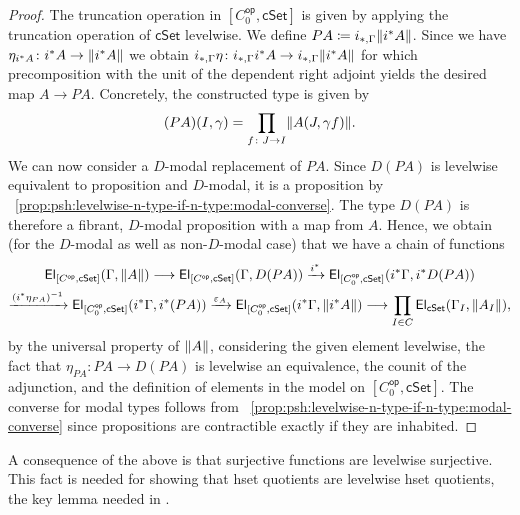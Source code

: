 \documentclass[10pt,a4paper]{article}
\theoremstyle{definition}
\theoremstyle{remark}
\newcommand{\cSet}{\mathsf{cSet}}
\DeclareMathOperator\op{\mathsf{op}}
\newcommand\El{\mathsf{El}}
\begin{document}
\begin{proof}
  The truncation operation in \([C_0^{\op}, \cSet]\) is given by applying the truncation operation of \(\cSet\) levelwise.
  We define \(PA \coloneqq i_{*,\Gamma}\trunc{i^*A}\).
  Since we have \(\eta_{i^*A} \colon i^* A \to \trunc{i^*A}\) we obtain \(i_{*,\Gamma}\eta \colon i_{*,\Gamma}i^*A \to i_{*,\Gamma}\trunc{i^*A}\) for which precomposition with the unit of the dependent right adjoint yields the desired map \(A \to PA\).
  Concretely, the constructed type is given by
  \[
    (PA)(I, \gamma) = \prod_{f \colon J \to I} \trunc{A(J, \gamma f)}.
  \]
  We can now consider a \(D\)-modal replacement of \(PA\).
  Since \(D(PA)\) is levelwise equivalent to proposition and \(D\)-modal, it is a proposition by ~\ref{prop:psh:levelwise-n-type-if-n-type:modal-converse}.
  The type \(D(PA)\) is therefore a fibrant, \(D\)-modal proposition with a map from \(A\).
  Hence, we obtain (for the \(D\)-modal as well as non-\(D\)-modal case) that we have a chain of functions
  \begin{multline*}
    \El_{[C^{\op}, \cSet]}(\Gamma, \trunc{A})
    \longrightarrow \El_{[C^{\op}, \cSet]}(\Gamma, D(PA))
    \xrightarrow{i^*} \El_{[C_0^{\op}, \cSet]}(i^*\Gamma, i^*D(PA)) \\
    \xrightarrow{(i^*\eta_{PA})^{-1}} \El_{[C_0^{\op}, \cSet]}(i^*\Gamma, i^*(PA))
    \xrightarrow{\varepsilon_A} \El_{[C_0^{\op}, \cSet]}(i^*\Gamma, \trunc{i^*A})
    \longrightarrow \prod_{I \in C} \El_{\cSet}(\Gamma_I, \trunc{A_I}),
  \end{multline*}
  by the universal property of \(\trunc{A}\), considering the given element levelwise, the fact that \(\eta_{PA} \colon PA \to D(PA)\) is levelwise an equivalence, the counit of the adjunction, and the definition of elements in the model on \([C^{\op}_0, \cSet]\).
  The converse for modal types follows from ~\ref{prop:psh:levelwise-n-type-if-n-type:modal-converse} since propositions are contractible exactly if they are inhabited.
\end{proof}

A consequence of the above is that surjective functions are levelwise surjective.
This fact is needed for showing that hset quotients are levelwise hset quotients, the key lemma needed in .
\end{document}
